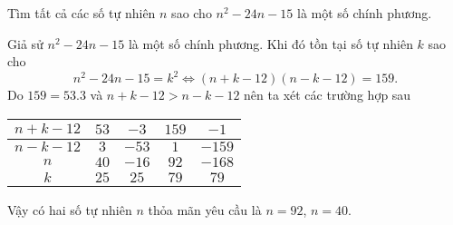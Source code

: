 \begin{bt}%
	\hfill   
	Tìm tất cả các số tự nhiên $n$ sao cho $n^2-24n-15$ là một số chính phương.
	\loigiai
	{
		Giả sử $n^2-24n-15$ là một số chính phương. 
		Khi đó tồn tại số tự nhiên $k$ sao cho 
		$$n^2-24n-15=k^2\Leftrightarrow \left( n+k-12 \right)\left( n-k-12 \right)=159.$$
		Do $159=53.3$ và $n+k-12>n-k-12$ nên ta xét các trường hợp sau
		\begin{center}
			\begin{tabular}{|l|l|l|l|l|}
				\hline
				\multicolumn{1}{|c|}{$n+k-12$} & \multicolumn{1}{c|}{$53$} & \multicolumn{1}{c|}{$-3$} & \multicolumn{1}{c|}{$159$} & \multicolumn{1}{c|}{$-1$} \\ 
				\hline
				\multicolumn{1}{|c|}{$n-k-12$} & \multicolumn{1}{c|}{$3$} & \multicolumn{1}{c|}{$-53$} & \multicolumn{1}{c|}{$1$} & \multicolumn{1}{c|}{$-159$} \\ 
				\hline
				\multicolumn{1}{|c|}{$n$} & \multicolumn{1}{c|}{$40$} & \multicolumn{1}{c|}{$-16$} & \multicolumn{1}{c|}{$92$} & \multicolumn{1}{c|}{$-168$} \\ 
				\hline
				\multicolumn{1}{|c|}{$k$} & \multicolumn{1}{c|}{$25$} & \multicolumn{1}{c|}{$25$} & \multicolumn{1}{c|}{$79$} & \multicolumn{1}{c|}{$79$} \\ 
				\hline
			\end{tabular}   
		\end{center}
		Vậy có hai số tự nhiên $n$ thỏa mãn yêu cầu là $n=92$, $n=40$.
	}
\end{bt}

